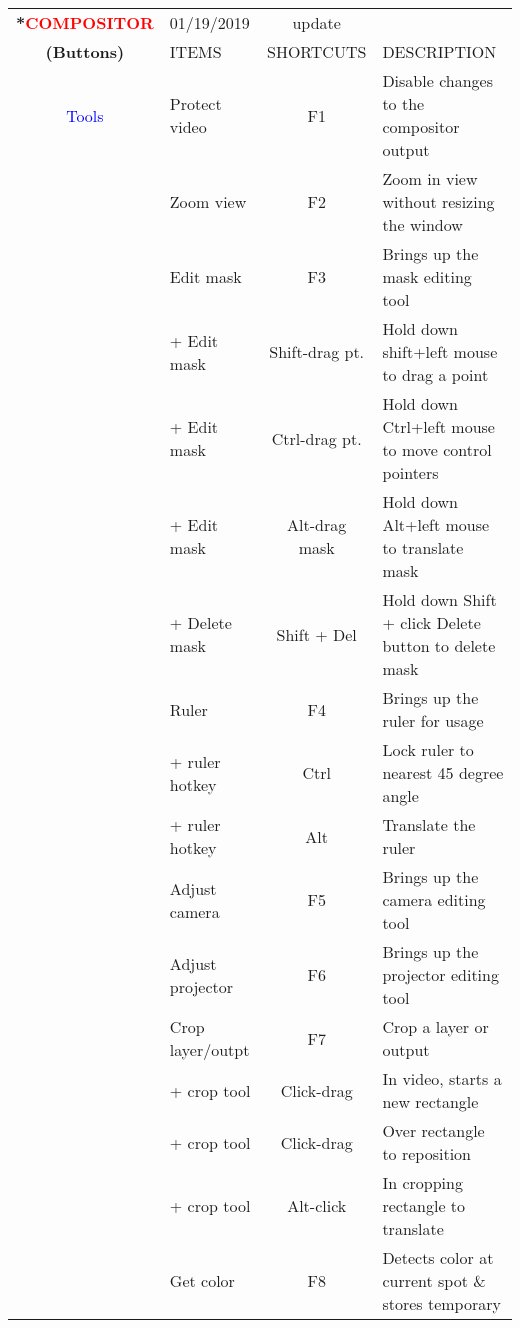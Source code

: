\begin{center}
    \small 
    \begin{longtable}{ >{\bfseries}c l c p{6cm}}             
        \toprule
        \multirow{2}*{\textcolor{red}{COMPOSITOR}} & 01/19/2019 & update & \\
        \noalign{\smallskip}
        \cline{2-4}
        \noalign{\smallskip}
        (Buttons) & ITEMS & SHORTCUTS & DESCRIPTION\\        
        \midrule
        \endhead   
                      
        \textcolor{blue}{Tools} & Protect video & F1 & Disable changes to the compositor output \\        
        & Zoom view & F2 & Zoom in view without resizing the window \\        
        & Edit mask & F3 & Brings up the mask editing tool \\        
        & + Edit mask & Shift-drag pt. & Hold down shift+left mouse to drag a point \\        
        & + Edit mask & Ctrl-drag pt. & Hold down Ctrl+left mouse to move control pointers \\        
        & + Edit mask & Alt-drag mask & Hold down Alt+left mouse to translate mask \\                
        & + Delete mask & Shift + Del & Hold down Shift + click Delete button to delete mask \\        
        & Ruler & F4 & Brings up the ruler for usage \\        
        & + ruler hotkey & Ctrl & Lock ruler to nearest 45 degree angle \\        
        & + ruler hotkey & Alt & Translate the ruler \\        
        & Adjust camera & F5 & Brings up the camera editing tool \\        
        & Adjust projector & F6 & Brings up the projector editing tool \\        
        & Crop layer/outpt & F7 & Crop a layer or output \\        
        & + crop tool & Click-drag & In video, starts a new rectangle \\        
        &  + crop tool & Click-drag & Over rectangle to reposition \\        
        &  + crop tool & Alt-click & In cropping rectangle to translate \\         
        & Get color & F8 & Detects color at current spot \& stores temporary \\        

\end{longtable}
\end{center}

